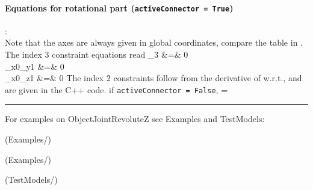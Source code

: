     \paragraph{Equations for rotational part (\texttt{activeConnector = True})}:\\
    Note that the axes are always given in global coordinates, compare the table in .
    The index 3 constraint equations read
    \bea \label{eq:ObjectJointRevoluteZ:index3}
       \lambda_3 &=& 0 \\
       _{x0}\tp {}_{y1} &=& 0 \\
       _{x0}\tp {}_{z1} &=& 0
    \eea
    The index 2 constraints follow from the derivative of  w.r.t., and are given in the C++ code.
%    
    if \texttt{activeConnector = False}, 
    \be
      \zv = \Null
    \ee
\vspace{6pt}\par\noindent\rule{\textwidth}{0.4pt}
%
\noindent For examples on ObjectJointRevoluteZ see Examples and TestModels:
\bi
\item {} (Examples/)
\item {} (Examples/)
\item {} (TestModels/)
\ei

%
\newpage


